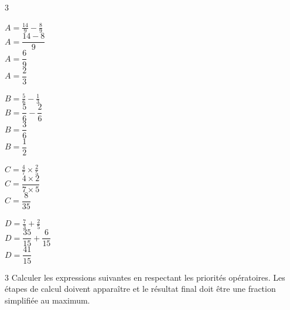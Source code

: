 \documentclass[a4paper]{book}
\begin{document}
{\begin{exerciceNote}{3}
        \vspace{0.5cm}
        \begin{minipage}[t]{0.23\textwidth}
            $A = \frac{14}{9} - \frac{8}{9}$ \\
            \color{red}\bfseries
            $A = \dfrac{14 - 8}{9}$ \\
            $A = \dfrac{6}{9}$ \\
            $A = \dfrac{2}{3}$
            \vspace{0.7cm}
        \end{minipage}\hfill \vline \hfill
        \begin{minipage}[t]{0.23\textwidth}
            $B = \frac{5}{6} - \frac{1}{3}$ \\
            \color{red}\bfseries
            $B = \dfrac{5}{6} - \dfrac{2}{6}$ \\
            $B = \dfrac{3}{6}$ \\
            $B = \dfrac{1}{2}$
            \vspace{0.7cm}
        \end{minipage}\hfill \vline \hfill
        \begin{minipage}[t]{0.23\textwidth}
            $C = \frac{4}{7} \times \frac{2}{5}$ \\
            \color{red}\bfseries
            $C = \dfrac{4 \times 2}{7 \times 5}$ \\
            $C = \dfrac{8}{35}$
            \vspace{1.5cm}
        \end{minipage}\hfill \vline \hfill
        \begin{minipage}[t]{0.23\textwidth}
            $D = \frac{7}{3}+\frac{2}{5}$ \\
            \color{red}\bfseries
            $D = \dfrac{35}{15} + \dfrac{6}{15}$ \\
            $D = \dfrac{41}{15}$
            \vspace{1.1cm}
        \end{minipage}
    \end{exerciceNote}

\newpage

    \begin{exerciceNote}{3}
        Calculer les expressions suivantes en respectant les priorités opératoires. Les étapes de calcul doivent apparaître et le résultat final doit être une fraction simplifiée au maximum.
        

\end{exerciceNote}}
\end{document}
